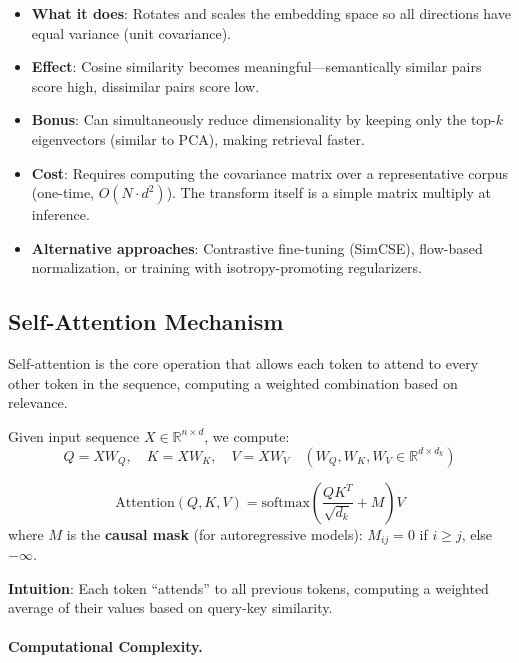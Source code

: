 \begin{keybox}
\begin{itemize}
  \item \textbf{What it does}: Rotates and scales the embedding space so all directions have equal variance (unit covariance).
  \item \textbf{Effect}: Cosine similarity becomes meaningful---semantically similar pairs score high, dissimilar pairs score low.
  \item \textbf{Bonus}: Can simultaneously reduce dimensionality by keeping only the top-$k$ eigenvectors (similar to PCA), making retrieval faster.
  \item \textbf{Cost}: Requires computing the covariance matrix over a representative corpus (one-time, $O(N \cdot d^2)$). The transform itself is a simple matrix multiply at inference.
  \item \textbf{Alternative approaches}: Contrastive fine-tuning (SimCSE), flow-based normalization, or training with isotropy-promoting regularizers.
\end{itemize}
\end{keybox}

\subsection{Self-Attention Mechanism}
\label{self-attention-mechanism}

Self-attention is the core operation that allows each token to attend to every other token in the sequence, computing a weighted combination based on relevance.

\begin{keybox}
Given input sequence $X \in \mathbb{R}^{n \times d}$, we compute: 
\[
Q = XW_Q, \quad K = XW_K, \quad V = XW_V \quad (W_Q, W_K, W_V \in \mathbb{R}^{d \times d_k})
\]
 
\[
\text{Attention}(Q, K, V) = \text{softmax}\!\left(\frac{QK^T}{\sqrt{d_k}} + M\right) V
\]
 where $M$ is the \textbf{causal mask} (for autoregressive models): $M_{ij} = 0$ if $i \geq j$, else $-\infty$.

\textbf{Intuition}: Each token ``attends'' to all previous tokens, computing a weighted average of their values based on query-key similarity.
\end{keybox}

\paragraph{Computational Complexity.}
\label{computational-complexity.}


